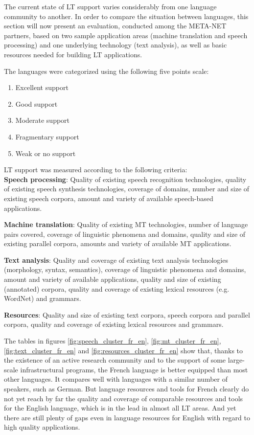 \begin{multicols}{2}
The current state of LT support varies considerably from one language
community to another. In order to compare the situation between
languages, this section will now present an evaluation, conducted
among the META-NET partners, based on two sample application areas
(machine translation and speech processing) and one underlying
technology (text analysis), as well as basic resources needed for
building LT applications.

The languages were categorized using the following five points scale:
\begin{enumerate}
\item Excellent support
\item Good support
\item Moderate support
\item Fragmentary support
\item Weak or no support
\end{enumerate}

LT support was measured according to the following criteria:\\

{\bf Speech processing}: Quality of existing speech recognition
technologies, quality of existing speech synthesis technologies,
coverage of domains, number and size of existing speech corpora,
amount and variety of available speech-based applications.

{\bf Machine translation}: Quality of existing MT technologies, number
of language pairs covered, coverage of linguistic phenomena and
domains, quality and size of existing parallel corpora, amounts and
variety of available MT applications.

{\bf Text analysis}: Quality and coverage of existing text analysis
technologies (morphology, syntax, semantics), coverage of linguistic
phenomena and domains, amount and variety of available applications,
quality and size of existing (annotated) corpora, quality and coverage
of existing lexical resources (e.g. WordNet) and grammars.

{\bf Resources}: Quality and size of existing text corpora, speech
corpora and parallel corpora, quality and coverage of existing lexical
resources and grammars.



The tables in figures \ref{fig:speech_cluster_fr_en},
\ref{fig:mt_cluster_fr_en}, \ref{fig:text_cluster_fr_en} and
\ref{fig:resources_cluster_fr_en} show that, thanks to the existence
of an active research community and to the support of some large-scale
infrastructural programs, the French language is better equipped than
most other languages. It compares well with languages with a similar
number of speakers, such as German. But language resources and tools
for French clearly do not yet reach by far the quality and coverage of
comparable resources and tools for the English language, which is in
the lead in almost all LT areas. And yet there are still plenty of
gaps even in language resources for English with regard to high
quality applications.


\end{multicols}
